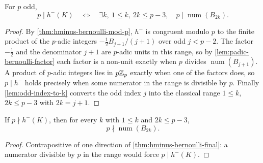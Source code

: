 \begin{theorem}\label{thm:hminus-bernoulli-final}
  \leanok
For $p$ odd,
\[
  p\mid h^-(K)
  \quad\Longleftrightarrow\quad
  \exists k,\ 1\le k,\ 2k\le p-3,\quad
  p\mid\operatorname{num}(B_{2k}).
\]
\end{theorem}
\begin{proof}\leanok
By \cref{thm:hminus-bernoulli-mod-p}, $h^-$ is congruent modulo $p$ to the
finite product of the $p$-adic integers $-\tfrac12 B_{j+1}/(j+1)$ over odd
$j < p-2$.  The factor $-\tfrac12$ and the denominator $j+1$ are $p$-adic
units in this range, so by \cref{lem:padic-bernoulli-factor} each factor is
a non-unit exactly when $p$ divides $\operatorname{num}(B_{j+1})$.  A
product of $p$-adic integers lies in $p\mathbb{Z}_p$ exactly when one of the
factors does, so $p \mid h^-$ holds precisely when some numerator in the
range is divisible by $p$.  Finally \cref{lem:odd-index-to-k} converts the
odd index $j$ into the classical range $1\le k$, $2k\le p-3$ with
$2k = j+1$.
\end{proof}

\begin{theorem}\label{thm:hminus-nondiv-to-bernoulli-nondiv}
  \leanok
If $p\nmid h^-(K)$, then for every $k$ with $1\le k$ and $2k\le p-3$,
\[
  p\nmid\operatorname{num}(B_{2k}).
\]
\end{theorem}
\begin{proof}\leanok
Contrapositive of one direction of \cref{thm:hminus-bernoulli-final}: a
numerator divisible by $p$ in the range would force $p\mid h^-(K)$.
\end{proof}
